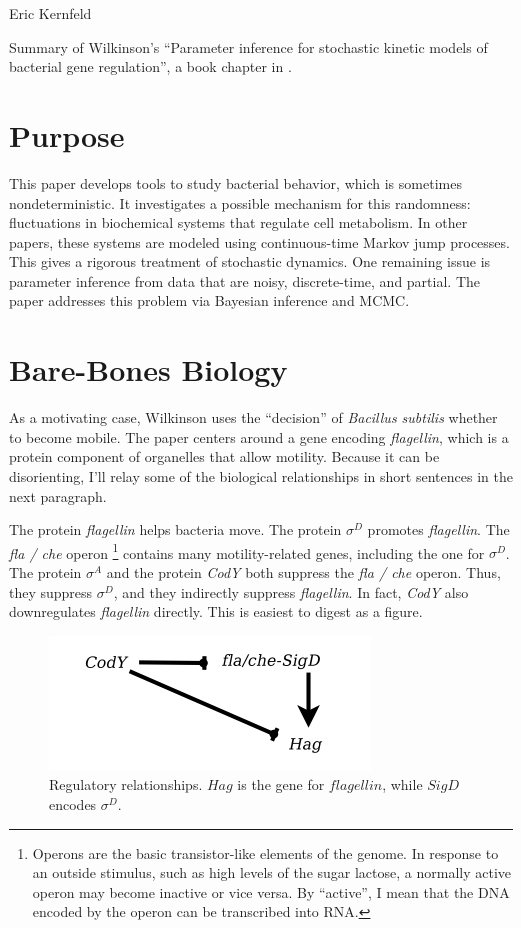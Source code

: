 \documentclass{article}
\begin{document}
Eric Kernfeld

Summary of Wilkinson's ``Parameter inference for stochastic kinetic models of bacterial gene regulation'', a book chapter in \cite{Bernardo2012}.

\section{Purpose}
This paper develops tools to study bacterial behavior, which is sometimes nondeterministic. It investigates a possible mechanism for this randomness: fluctuations in biochemical systems that regulate cell metabolism. In other papers, these systems are modeled using continuous-time Markov jump processes. This gives a rigorous treatment of stochastic dynamics. One remaining issue is parameter inference from data that are noisy, discrete-time, and partial. The paper addresses this problem via Bayesian inference and MCMC.

\section{Bare-Bones Biology}
 As a motivating case, Wilkinson uses the ``decision'' of {\it Bacillus subtilis} whether to become mobile. The paper centers around a gene encoding {\it flagellin}, which is a protein component of organelles that allow motility. Because it can be disorienting, I'll relay some of the biological relationships in short sentences in the next paragraph. 

The protein {\it flagellin} helps bacteria move. The protein $\sigma^D$ promotes {\it flagellin}. The {\it fla / che} operon \footnote{Operons are the basic transistor-like elements of the genome. In response to an outside stimulus, such as high levels of the sugar lactose, a normally active operon may become inactive or vice versa. By ``active'', I mean that the DNA encoded by the operon can be transcribed into RNA.} contains many motility-related genes, including the one for $\sigma^D$. The protein $\sigma^A$ and the protein {\it CodY} both suppress the {\it fla / che} operon. Thus, they suppress $\sigma^D$, and they indirectly suppress {\it flagellin}. In fact, {\it CodY} also downregulates {\it flagellin} directly. This is easiest to digest as a figure.

\begin{figure}[h!]
\begin{center}
\includegraphics[scale=0.5]{wilkinson_reg_network.png}
\caption{Regulatory relationships. $Hag$ is the gene for $flagellin$, while $SigD$ encodes $\sigma^D$.}
\end{center}
\label{fig:}
\end{figure}
\end{document}
